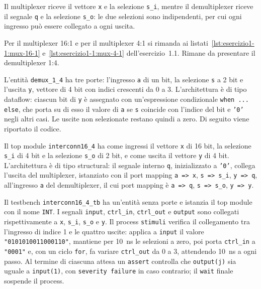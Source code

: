 Il multiplexer riceve il vettore \texttt{x} e la selezione \texttt{s\_i}, mentre il demultiplexer riceve il segnale \texttt{q} e la selezione \texttt{s\_o}: le due selezioni sono indipendenti, per cui ogni ingresso può essere collegato a ogni uscita.

\implementazione

Per il multiplexer 16:1 e per il multiplexer 4:1 si rimanda ai listati~\ref{lst:esercizio1-1:mux-16-1} e~\ref{lst:esercizio1-1:mux-4-1} dell'esercizio~1.1. Rimane da presentare il demultiplexer 1:4.

L'entità \texttt{demux\_1\_4} ha tre porte: l'ingresso \texttt{a} di un bit, la selezione \texttt{s} a 2 bit e l'uscita \texttt{y}, vettore di 4 bit con indici crescenti da 0 a 3. L'architettura è di tipo dataflow: ciascun bit di \texttt{y} è assegnato con un'espressione condizionale \texttt{when ... else}, che porta su di esso il valore di \texttt{a} se \texttt{s} coincide con l'indice del bit e \texttt{'0'} negli altri casi. Le uscite non selezionate restano quindi a zero. Di seguito viene riportato il codice.


Il top module \texttt{interconn16\_4} ha come ingressi il vettore \texttt{x} di 16 bit, la selezione \texttt{s\_i} di 4 bit e la selezione \texttt{s\_o} di 2 bit, e come uscita il vettore \texttt{y} di 4 bit. L'architettura è di tipo structural: il segnale interno \texttt{q}, inizializzato a \texttt{'0'}, collega l'uscita del multiplexer, istanziato con il port mapping \texttt{a => x}, \texttt{s => s\_i}, \texttt{y => q}, all'ingresso \texttt{a} del demultiplexer, il cui port mapping è \texttt{a => q}, \texttt{s => s\_o}, \texttt{y => y}. 


\simulazione

Il testbench \texttt{interconn16\_4\_tb} ha un'entità senza porte e istanzia il top module con il nome \texttt{INT}. I segnali \texttt{input}, \texttt{ctrl\_in}, \texttt{ctrl\_out} e \texttt{output} sono collegati rispettivamente a \texttt{x}, \texttt{s\_i}, \texttt{s\_o} e \texttt{y}. Il process \texttt{stimuli} verifica il collegamento tra l'ingresso di indice 1 e le quattro uscite: applica a \texttt{input} il valore \texttt{"0101010011000110"}, mantiene per \SI{10}{ns} le selezioni a zero, poi porta \texttt{ctrl\_in} a \texttt{"0001"} e, con un ciclo \texttt{for}, fa variare \texttt{ctrl\_out} da 0 a 3, attendendo \SI{10}{ns} a ogni passo. Al termine di ciascuna attesa un \texttt{assert} controlla che \texttt{output(j)} sia uguale a \texttt{input(1)}, con \texttt{severity failure} in caso contrario; il \texttt{wait} finale sospende il process.

